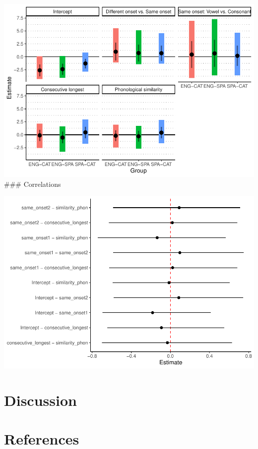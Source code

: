 \documentclass[
  english,
  man]{apa6}
\begin{document}
\includegraphics{te_manuscript_files/figure-latex/group_effects-1.pdf}
\#\#\# Correlations

\includegraphics{te_manuscript_files/figure-latex/correlations-1.pdf}

\hypertarget{discussion}{%
\section{Discussion}\label{discussion}}

\newpage

\hypertarget{references}{%
\section{References}\label{references}}

\begingroup
\setlength{\parindent}{-0.5in}
\setlength{\leftskip}{0.5in}

\hypertarget{refs}{}

\endgroup
\end{document}
